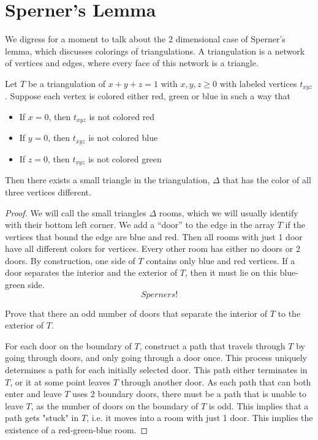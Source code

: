 
\section{Sperner's Lemma}
	We digress for a moment to talk about the 2 dimensional case of Sperner's lemma, which discusses colorings of triangulations. A triangulation is a network of vertices and edges, where every face of this network is a triangle. 
	\begin{theorem}
	Let $T$ be a triangulation of $x+y+z=1$ with $x, y, z\geq 0$ with labeled vertices $t_{xyz}$. Suppose each vertex is colored either red, green or blue in such a way that 
	\begin{itemize}
	\item If $x=0$, then $t_{xyz}$ is not colored red
	\item If $y=0$, then $t_{xyz}$ is not colored blue
	\item If $z=0$, then $t_{xyz}$ is not colored green
	\end{itemize}
	Then there exists a small triangle in the triangulation, $\Delta$ that has the color of all three vertices different.
	\end{theorem}
	\begin{proof} 
	We will call the small triangles $\Delta$ rooms, which we will usually identify with their bottom left corner.
	We add a ``door'' to the edge in the array $T$ if the vertices that bound the edge are blue and red. Then all rooms with just 1 door have all different colors for vertices. Every other room has either no doors or 2 doors. 
	By construction, one side of $T$ contains only blue and red vertices. If a door separates the interior and the exterior of $T$, then it must lie on this blue-green side.
\[
         Sperners!%
\]
	\begin{exercise}
	Prove that there an odd number of doors that separate the interior of $T$ to the exterior of $T$.
	\end{exercise}
	For each door on the boundary of $T$, construct a path that travels through $T$ by going through doors, and only going through a door once. This process uniquely determines a path for each initially selected door. This path either terminates in $T$, or it at some point leaves $T$ through another door. As each path that can both enter and leave $T$ uses 2 boundary doors, there must be a path that is unable to leave $T$, as the number of doors on the boundary of $T$ is odd. This implies that a path gets "stuck" in $T$, i.e. it moves into a room with just 1 door. This implies the existence of a red-green-blue room.
	\end{proof}

